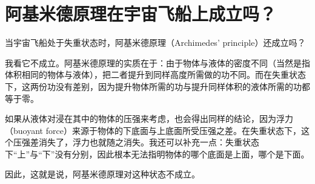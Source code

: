 
\chapter[阿基米德原理在宇宙飞船上成立吗？]{阿基米德原理在宇宙飞船上成立吗？\label{ch-17}}

\begin{dialogue}

\tchr 当宇宙飞船处于失重状态时，阿基米德原理（Archimedes' principle）还成立吗？

\stda 我看它不成立。阿基米德原理的实质在于：由于物体与液体的密度不同（当然是指体积相同的物体与液体），把二者提升到同样高度所需做的功不同。而在失重状态下，这两份功没有差别，因为提升物体所需的功与提升同样体积的液体所需的功都等于零。

如果从液体对浸在其中的物体的压强来考虑，也会得出同样的结论，因为浮力（buoyant force）来源于物体的下底面与上底面所受压强之差。在失重状态下，这个压强差消失了，浮力也就随之消失。我还可以补充一点：失重状态下“上”与“下”没有分别，因此根本无法指明物体的哪个底面是上面，哪个是下面。

因此，这就是说，阿基米德原理对这种状态不成立。


\end{dialogue}
